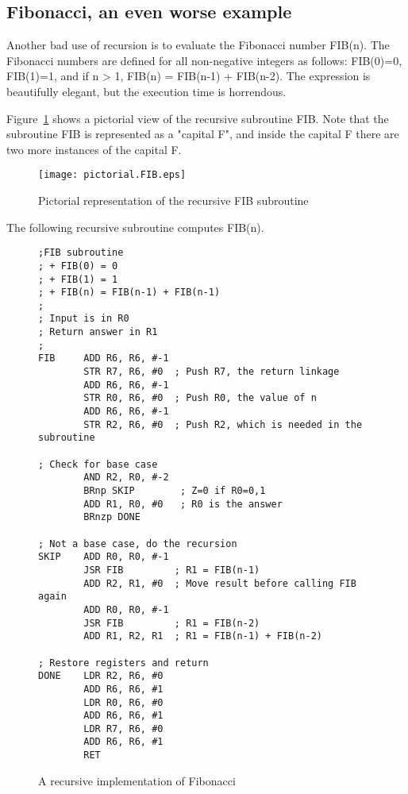 \documentclass{patt}
\begin{document}
\FloatBarrier
\subsection{Fibonacci, an even worse example}

Another bad use of recursion is to evaluate the Fibonacci number FIB(n).
The Fibonacci numbers are defined for all non-negative integers as follows:
FIB(0)=0, FIB(1)=1, and if n > 1, FIB(n) = FIB(n-1) + FIB(n-2).  The expression
is beautifully elegant, but the execution time is horrendous.  

Figure~\ref{fig:pictorial.FIB} shows a pictorial view of the recursive 
subroutine FIB.  Note that the subroutine FIB is represented as a "capital F", 
and inside the capital F there are two more instances of the capital F.  

\begin{figure}[h]
\centerline{\texttt{[image: pictorial.FIB.eps]}}
\caption{Pictorial representation of the recursive FIB subroutine}
\label{fig:pictorial.FIB}
\end{figure}

\FloatBarrier
The following recursive subroutine computes FIB(n).

\begin{figure}[h!]
\begin{minipage}{36pc}
\begin{Verbatim}[fontsize=\fontsize{9}{11}\selectfont]
;FIB subroutine
; + FIB(0) = 0
; + FIB(1) = 1
; + FIB(n) = FIB(n-1) + FIB(n-1)
;
; Input is in R0
; Return answer in R1
;
FIB     ADD R6, R6, #-1
        STR R7, R6, #0  ; Push R7, the return linkage
        ADD R6, R6, #-1
        STR R0, R6, #0  ; Push R0, the value of n
        ADD R6, R6, #-1
        STR R2, R6, #0  ; Push R2, which is needed in the subroutine

; Check for base case
        AND R2, R0, #-2
        BRnp SKIP        ; Z=0 if R0=0,1
        ADD R1, R0, #0   ; R0 is the answer
        BRnzp DONE

; Not a base case, do the recursion
SKIP    ADD R0, R0, #-1
        JSR FIB         ; R1 = FIB(n-1)
        ADD R2, R1, #0  ; Move result before calling FIB again
        ADD R0, R0, #-1
        JSR FIB         ; R1 = FIB(n-2)
        ADD R1, R2, R1  ; R1 = FIB(n-1) + FIB(n-2)

; Restore registers and return
DONE    LDR R2, R6, #0
        ADD R6, R6, #1
        LDR R0, R6, #0
        ADD R6, R6, #1
        LDR R7, R6, #0
        ADD R6, R6, #1
        RET
\end{Verbatim}
\caption{A recursive implementation of Fibonacci}
\label{fig:aaa}
\end{minipage}
\end{figure}
\end{document}
